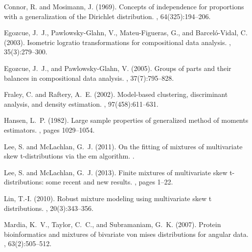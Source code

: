 \documentclass[10pt, a4paper]{article}
\begin{document}
\begin{thebibliography}{00}
Connor, R. and Mosimann, J. (1969).
\newblock Concepts of independence for proportions with a generalization of the
  {D}irichlet distribution.
,
  64(325):194--206.

Egozcue, J.~J., Pawlowsky-Glahn, V., Mateu-Figueras, G., and Barcel{\'o}-Vidal,
  C. (2003).
\newblock Isometric logratio transformations for compositional data analysis.
, 35(3):279--300.

Egozcue, J.~J., and Pawlowsky-Glahn, V. (2005).
\newblock Groups of parts and their balances in compositional data analysis.
, 37(7):795--828.

Fraley, C. and Raftery, A.~E. (2002).
\newblock Model-based clustering, discriminant analysis, and density
  estimation.
,
  97(458):611--631.

Hansen, L.~P. (1982).
\newblock Large sample properties of generalized method of moments estimators.
, pages
  1029--1054.

Lee, S. and McLachlan, G.~J. (2011).
\newblock On the fitting of mixtures of multivariate skew t-distributions via
  the em algorithm.
.

Lee, S. and McLachlan, G.~J. (2013).
\newblock Finite mixtures of multivariate skew t-distributions: some recent and
  new results.
, pages 1--22.

Lin, T.-I. (2010).
\newblock Robust mixture modeling using multivariate skew t distributions.
, 20(3):343--356.


Mardia, K.~V., Taylor, C.~C., and Subramaniam, G.~K. (2007).
\newblock Protein bioinformatics and mixtures of bivariate von mises
  distributions for angular data.
, 63(2):505--512.


\end{thebibliography}
\end{document}
